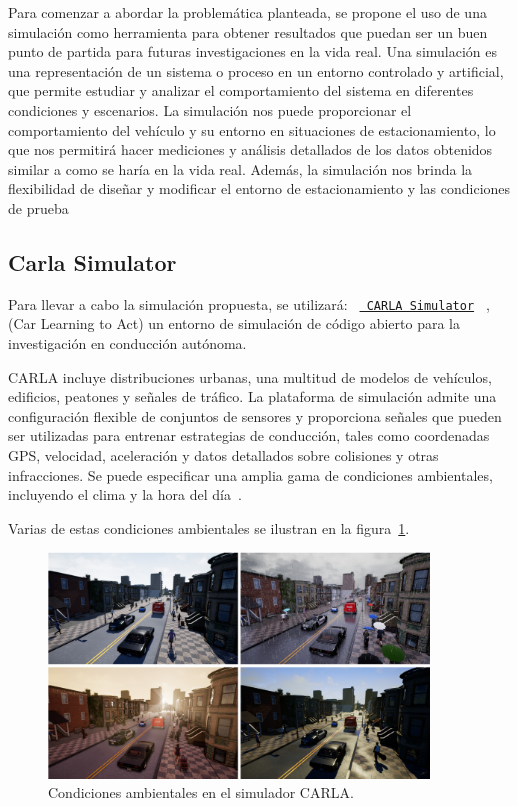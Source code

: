
\noindent
Para comenzar a abordar la problemática planteada, se propone el uso de una simulación como herramienta para
obtener resultados que puedan ser un buen punto de partida para futuras investigaciones en la vida real.
Una simulación es una representación de un sistema o proceso en un entorno controlado y artificial,
que permite estudiar y analizar el comportamiento del sistema en diferentes condiciones y escenarios.
La simulación nos puede proporcionar el comportamiento del vehículo y su entorno en situaciones de estacionamiento,
lo que nos permitirá hacer mediciones y análisis detallados de los datos obtenidos similar a como se haría en la vida real.
Además, la simulación nos brinda la flexibilidad de diseñar y modificar el entorno de estacionamiento y las condiciones de prueba

\subsection{Carla Simulator}\label{subsec:carla-simulator}
Para llevar a cabo la simulación propuesta, se utilizará: \texttt{%
    \href{https://github.com/carla-simulator/carla}{%
        CARLA Simulator}%
}
, (Car Learning to Act) un entorno de simulación de código abierto para la investigación en conducción autónoma.

CARLA incluye distribuciones urbanas, una multitud de modelos de vehículos, edificios, peatones y señales de tráfico. La plataforma de simulación admite una configuración flexible de conjuntos de sensores y proporciona señales
que pueden ser utilizadas para entrenar estrategias de conducción, tales como coordenadas GPS, velocidad, aceleración y datos detallados sobre colisiones y otras infracciones. Se puede especificar una amplia gama de condiciones ambientales, incluyendo el clima y la hora del día~\cite{dosovitskiy2017carla}.

Varias de estas condiciones ambientales se ilustran en la figura~\ref{fig:carla-simulator}.

\begin{figure}[!ht]
    \centering
    \includegraphics[width=0.9\textwidth]{img/carla_clima_example}
    \caption{Condiciones ambientales en el simulador CARLA.}
    \label{fig:carla-simulator}
\end{figure}

